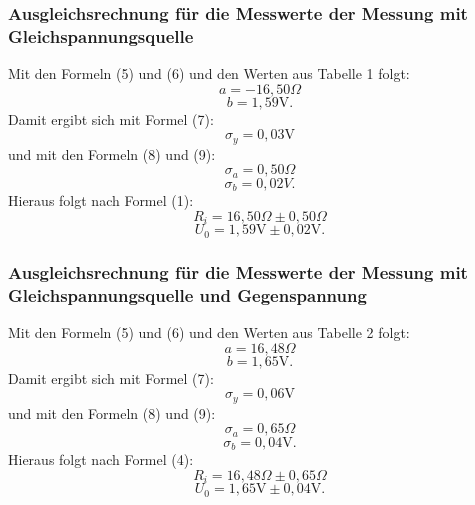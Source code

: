 \subsubsection{Ausgleichsrechnung für die Messwerte der Messung mit Gleichspannungsquelle}
Mit den Formeln (5) und (6) und den Werten aus Tabelle 1 folgt:
\begin{displaymath}
	a=-16,50\Omega
\end{displaymath}
\begin{displaymath}
	b=1,59\text{V.}
\end{displaymath}
Damit ergibt sich mit Formel (7):
\begin{displaymath}
	\sigma_y=0,03\text{V}
\end{displaymath}
und mit den Formeln (8) und (9):
\begin{displaymath}
	\sigma_a=0,50\Omega
\end{displaymath}
\begin{displaymath}
	\sigma_b=0,02V\text{.}
\end{displaymath}
Hieraus folgt nach Formel (1):
\begin{displaymath}
	R_i=16,50\Omega\pm 0,50\Omega
\end{displaymath}
\begin{displaymath}
	U_0=1,59\text{V}\pm 0,02\text{V.}
\end{displaymath}

\subsubsection{Ausgleichsrechnung für die Messwerte der Messung mit Gleichspannungsquelle und Gegenspannung}

Mit den Formeln (5) und (6) und den Werten aus Tabelle 2 folgt:
\begin{displaymath}
a=16,48\Omega
\end{displaymath}
\begin{displaymath}
b=1,65\text{V.}
\end{displaymath}
Damit ergibt sich mit Formel (7):
\begin{displaymath}
\sigma_y=0,06\text{V}
\end{displaymath}
und mit den Formeln (8) und (9):
\begin{displaymath}
\sigma_a=0,65\Omega
\end{displaymath}
\begin{displaymath}
\sigma_b=0,04\text{V.}
\end{displaymath}
Hieraus folgt nach Formel (4):
\begin{displaymath}
R_i=16,48\Omega\pm 0,65\Omega
\end{displaymath}
\begin{displaymath}
U_0=1,65\text{V}\pm 0,04\text{V.}
\end{displaymath}

